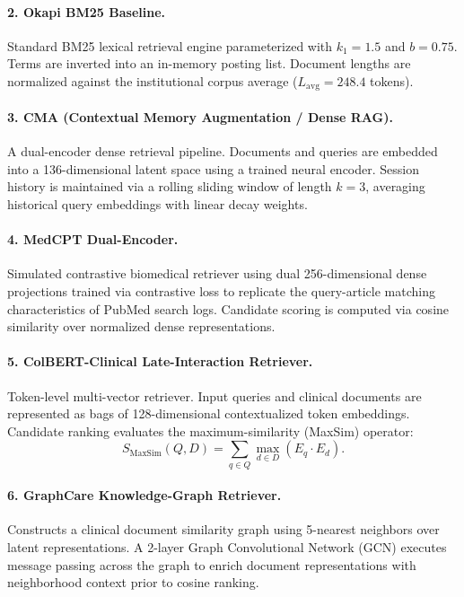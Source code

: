 \documentclass[11pt]{article}
\begin{document}
\paragraph{2. Okapi BM25 Baseline.}
Standard BM25 lexical retrieval engine parameterized with $k_1 = 1.5$ and $b = 0.75$. Terms are inverted into an in-memory posting list. Document lengths are normalized against the institutional corpus average ($L_{\text{avg}} = 248.4$ tokens).

\paragraph{3. CMA (Contextual Memory Augmentation / Dense RAG).}
A dual-encoder dense retrieval pipeline. Documents and queries are embedded into a 136-dimensional latent space using a trained neural encoder. Session history is maintained via a rolling sliding window of length $k=3$, averaging historical query embeddings with linear decay weights.

\paragraph{4. MedCPT Dual-Encoder.}
Simulated contrastive biomedical retriever using dual 256-dimensional dense projections trained via contrastive loss to replicate the query-article matching characteristics of PubMed search logs. Candidate scoring is computed via cosine similarity over normalized dense representations.

\paragraph{5. ColBERT-Clinical Late-Interaction Retriever.}
Token-level multi-vector retriever. Input queries and clinical documents are represented as bags of 128-dimensional contextualized token embeddings. Candidate ranking evaluates the maximum-similarity (MaxSim) operator:
\begin{equation}
  S_{\text{MaxSim}}(Q, D) = \sum_{q \in Q} \max_{d \in D} (E_q \cdot E_d).
\end{equation}

\paragraph{6. GraphCare Knowledge-Graph Retriever.}
Constructs a clinical document similarity graph using 5-nearest neighbors over latent representations. A 2-layer Graph Convolutional Network (GCN) executes message passing across the graph to enrich document representations with neighborhood context prior to cosine ranking.
\end{document}
